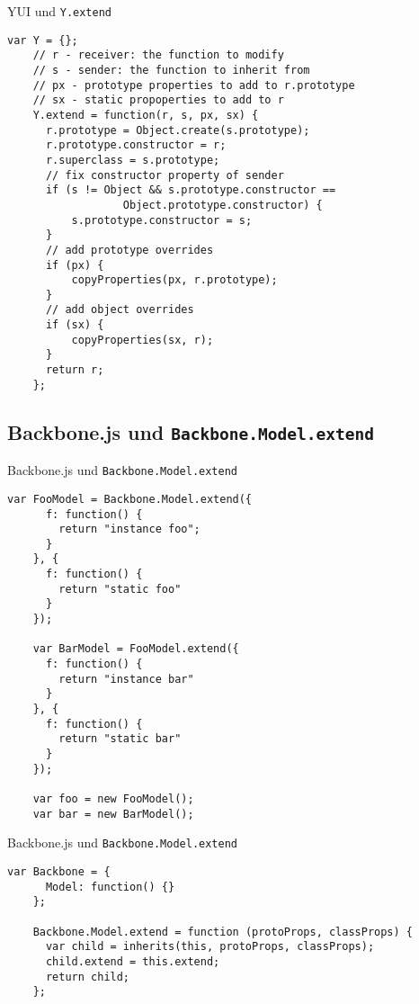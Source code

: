 \begin{frame}[fragile]{YUI und \texttt{Y.extend}}
  \begin{lstlisting}[gobble=4]
    var Y = {};    
    // r - receiver: the function to modify
    // s - sender: the function to inherit from
    // px - prototype properties to add to r.prototype
    // sx - static propoperties to add to r
    Y.extend = function(r, s, px, sx) {
      r.prototype = Object.create(s.prototype);
      r.prototype.constructor = r;
      r.superclass = s.prototype;
      // fix constructor property of sender
      if (s != Object && s.prototype.constructor ==
                  Object.prototype.constructor) {
          s.prototype.constructor = s;
      }
      // add prototype overrides
      if (px) {
          copyProperties(px, r.prototype);
      }
      // add object overrides
      if (sx) {
          copyProperties(sx, r);
      }
      return r;
    };
  \end{lstlisting}
\end{frame}

\subsection{Backbone.js und \texttt{Backbone.Model.extend}}

\begin{frame}[fragile]{Backbone.js und \texttt{Backbone.Model.extend}}
  \begin{lstlisting}[gobble=4]
    var FooModel = Backbone.Model.extend({
      f: function() {
        return "instance foo";
      }
    }, {
      f: function() {
        return "static foo"
      }
    });
    
    var BarModel = FooModel.extend({
      f: function() {
        return "instance bar"
      }
    }, {
      f: function() {
        return "static bar"
      }
    });
    
    var foo = new FooModel();
    var bar = new BarModel();
  \end{lstlisting}
\end{frame}

\begin{frame}[fragile]{Backbone.js und \texttt{Backbone.Model.extend}}
  \begin{lstlisting}[gobble=4]
    var Backbone = {
      Model: function() {}
    };
    
    Backbone.Model.extend = function (protoProps, classProps) {
      var child = inherits(this, protoProps, classProps);
      child.extend = this.extend;
      return child;
    };
  \end{lstlisting}
\end{frame}

